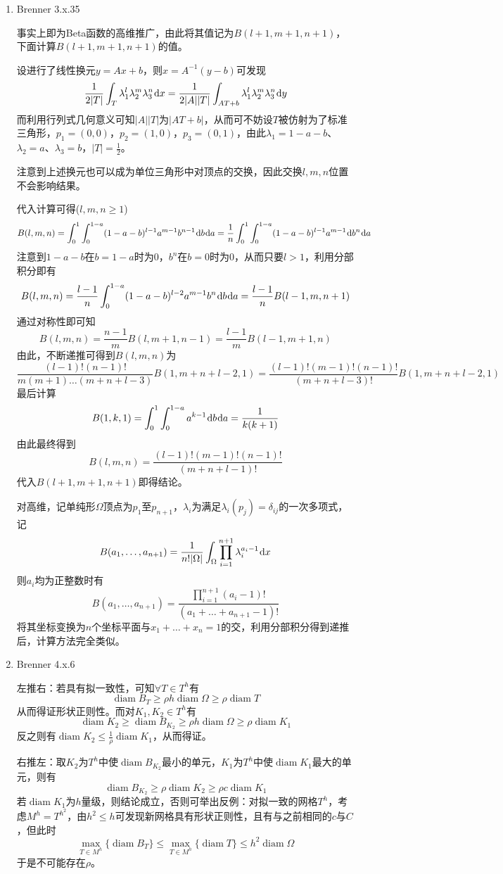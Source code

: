 \documentclass[a4paper,UTF8,fontset=windows,10pt]{ctexart}
\newcommand*{\dr}{\hspace{0.07em}\mathrm{d}}
\DeclareMathOperator*{\diam}{diam}
\begin{document}
\begin{enumerate}
    \item Brenner 3.x.35
    
    事实上即为Beta函数的高维推广，由此将其值记为$B(l+1,m+1,n+1)$，下面计算$B(l+1,m+1,n+1)$的值。
    
    设进行了线性换元$y=Ax+b$，则$x=A^{-1}(y-b)$可发现
    $$\frac{1}{2|T|}\int_T\lambda_1^l\lambda_2^m\lambda_3^n\dr x=\frac{1}{2|A||T|}\int_{AT+b}\lambda_1^l\lambda_2^m\lambda_3^n\dr y$$
    而利用行列式几何意义可知$|A||T|$为$|AT+b|$，从而可不妨设$T$被仿射为了标准三角形，$p_1=(0,0)$，$p_2=(1,0)$，$p_3=(0,1)$，由此$\lambda_1=1-a-b$、$\lambda_2=a$、$\lambda_3=b$，$|T|=\frac{1}{2}$。
    
    注意到上述换元也可以成为单位三角形中对顶点的交换，因此交换$l,m,n$位置不会影响结果。
    
    代入计算可得($l,m,n\ge1$)
    $$B(l,m,n)=\int_0^1\int_0^{1-a}(1-a-b)^{l-1}a^{m-1}b^{n-1}\dr b\dr a=\frac{1}{n}\int_0^1\int_0^{1-a}(1-a-b)^{l-1}a^{m-1}\dr b^n\dr a$$
    注意到$1-a-b$在$b=1-a$时为0，$b^n$在$b=0$时为0，从而只要$l>1$，利用分部积分即有
    $$B(l,m,n)=\frac{l-1}{n}\int_0^{1-a}(1-a-b)^{l-2}a^{m-1}b^n\dr b\dr a=\frac{l-1}{n}B(l-1,m,n+1)$$
    通过对称性即可知
    $$B(l,m,n)=\frac{n-1}{m}B(l,m+1,n-1)=\frac{l-1}{m}B(l-1,m+1,n)$$
    由此，不断递推可得到$B(l,m,n)$为
    $$\frac{(l-1)!(n-1)!}{m(m+1)\dots(m+n+l-3)}B(1,m+n+l-2,1)=\frac{(l-1)!(m-1)!(n-1)!}{(m+n+l-3)!}B(1,m+n+l-2,1)$$
    最后计算
    $$B(1,k,1)=\int_0^1\int_0^{1-a}a^{k-1}\dr b\dr a=\frac{1}{k(k+1)}$$
    由此最终得到
    $$B(l,m,n)=\frac{(l-1)!(m-1)!(n-1)!}{(m+n+l-1)!}$$
    代入$B(l+1,m+1,n+1)$即得结论。
    
    对高维，记单纯形$\Omega$顶点为$p_1$至$p_{n+1}$，$\lambda_i$为满足$\lambda_i(p_j)=\delta_{ij}$的一次多项式，记
    $$B(a_1,\dots,a_{n+1})=\frac{1}{n!|\Omega|}\int_\Omega\prod_{i=1}^{n+1}\lambda_i^{a_i-1}\dr x$$
    则$a_i$均为正整数时有
    $$B(a_1,\dots,a_{n+1})=\frac{\prod_{i=1}^{n+1}(a_i-1)!}{(a_1+\dots+a_{n+1}-1)!}$$
    将其坐标变换为$n$个坐标平面与$x_1+\dots+x_n=1$的交，利用分部积分得到递推后，计算方法完全类似。
    
    \item Brenner 4.x.6
    
    左推右：若具有拟一致性，可知$\forall T\in T^h$有
    $$\diam B_T\ge \rho h\diam\Omega\ge\rho\diam T$$
    从而得证形状正则性。而对$K_1,K_2\in T^h$有
    $$\diam K_2\ge\diam B_{K_2}\ge\rho h\diam\Omega\ge\rho\diam K_1$$
    反之则有$\diam K_2\le\frac{1}{\rho}\diam K_1$，从而得证。
    
    右推左：取$K_2$为$T^h$中使$\diam B_{K_2}$最小的单元，$K_1$为$T^h$中使$\diam K_1$最大的单元，则有
    $$\diam B_{K_2}\ge\rho\diam K_2\ge\rho c\diam K_1$$
    若$\diam K_1$为$h$量级，则结论成立，否则可举出反例：对拟一致的网格$T^h$，考虑$M^h=T^{h^2}$，由$h^2\le h$可发现新网格具有形状正则性，且有与之前相同的$c$与$C$，但此时
    $$\max_{T\in M^h}\{\diam B_T\}\le\max_{T\in M^h}\{\diam T\}\le h^2\diam\Omega$$
    于是不可能存在$\rho$。
    

\end{enumerate}
\end{document}
